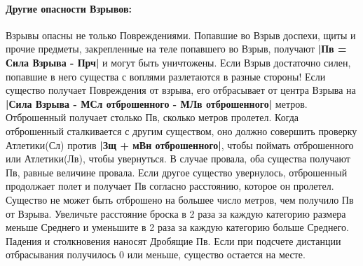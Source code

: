 \paragraph{Другие опасности Взрывов:} Взрывы опасны не только Повреждениями. Попавшие во Взрыв доспехи, щиты и прочие предметы, закрепленные на теле попавшего во Взрыв, получают \textbf{|Пв = Сила Взрыва - Прч|} и могут быть уничтожены. Если Взрыв достаточно силен, попавшие в него существа с воплями разлетаются в разные стороны! Если существо получает Повреждения от взрыва, его отбрасывает от центра Взрыва на \textbf{|Сила Взрыва - МСл отброшенного - МЛв отброшенного|} метров. Отброшенный получает столько Пв, сколько метров пролетел. Когда отброшенный сталкивается с другим существом, оно должно совершить проверку Атлетики(Сл) против \textbf{|Зщ + мВн отброшенного|}, чтобы поймать отброшенного или Атлетики(Лв), чтобы увернуться. В случае провала, оба существа получают Пв, равные величине провала. Если другое существо увернулось, отброшенный продолжает полет и получает Пв согласно расстоянию, которое он пролетел. Существо не может быть отброшено на большее число метров, чем получило Пв от Взрыва. Увеличьте расстояние броска в 2 раза за каждую категорию размера меньше Среднего и уменьшите в 2 раза за каждую категорию больше Среднего. Падения и столкновения наносят Дробящие Пв.
\newline
Если при подсчете дистанции отбрасывания получилось 0 или меньше, существо остается на месте.
